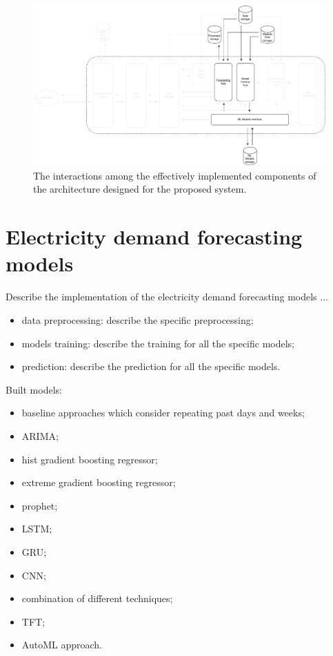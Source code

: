 \begin{figure}[H]
\centering
\includegraphics[width=1\textwidth]{images/implementation_interactions}
\caption{The interactions among the effectively implemented components of the architecture designed for the proposed system.}
\label{fig:implementationinteractions}
\end{figure}


\section{Electricity demand forecasting models}
\label{sec:demandimpl}
\vspace{0.2 cm}

Describe the implementation of the electricity demand forecasting models ...
\begin{itemize}
  \item data preprocessing: describe the specific preprocessing;
  \item models training: describe the training for all the specific models;
  \item prediction: describe the prediction for all the specific models.
\end{itemize}

Built models:
\begin{itemize}
  \item baseline approaches which consider repeating past days and weeks;
  \item ARIMA;
  \item hist gradient boosting regressor;
  \item extreme gradient boosting regressor;
  \item prophet;
  \item LSTM;
  \item GRU;
  \item CNN;
  \item combination of different techniques;
  \item TFT;
  \item AutoML approach.
\end{itemize}

